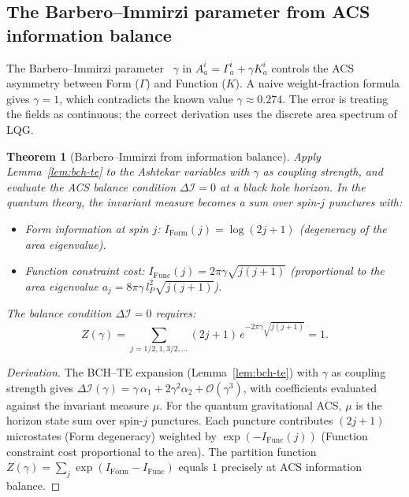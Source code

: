 \documentclass[11pt,a4paper]{article}
\theoremstyle{plain}
\newtheorem{theorem}{Theorem}[section]
\theoremstyle{definition}
\theoremstyle{remark}
\newcommand{\DI}{\Delta\mathcal{I}}
\newcommand{\Order}[1]{\mathcal{O}(#1)}
\begin{document}
\subsection{The Barbero--Immirzi parameter from ACS information balance}

The Barbero--Immirzi parameter~\cite{Barbero1995,Immirzi1997} $\gamma$ in $A^i_a = \Gamma^i_a + \gamma K^i_a$
controls the ACS asymmetry between Form ($\Gamma$) and Function ($K$).
A naive weight-fraction formula gives $\gamma = 1$, which contradicts the
known value $\gamma \approx 0.274$.  The error is treating the fields as
continuous; the correct derivation uses the discrete area spectrum of LQG.

\begin{theorem}[Barbero--Immirzi from information balance]\label{thm:BI}
Apply Lemma~\ref{lem:bch-te} to the Ashtekar variables with $\gamma$
as coupling strength, and evaluate the ACS balance condition $\DI = 0$
at a black hole horizon.  In the quantum theory, the invariant measure
becomes a sum over spin-$j$ punctures with:
\begin{itemize}[noitemsep]
  \item Form information at spin $j$: $I_{\mathrm{Form}}(j) = \log(2j+1)$
    (degeneracy of the area eigenvalue).
  \item Function constraint cost: $I_{\mathrm{Func}}(j) = 2\pi\gamma\sqrt{j(j+1)}$
    (proportional to the area eigenvalue $a_j = 8\pi\gamma\,l_P^2\sqrt{j(j+1)}$).
\end{itemize}
The balance condition $\DI = 0$ requires:
\begin{equation}\label{eq:BI-partition}
  Z(\gamma) = \sum_{j=1/2,1,3/2,\ldots} (2j+1)\,
  e^{-2\pi\gamma\sqrt{j(j+1)}} = 1.
\end{equation}
\end{theorem}

\begin{proof}[Derivation]
The BCH--TE expansion (Lemma~\ref{lem:bch-te}) with $\gamma$ as
coupling strength gives $\DI(\gamma) = \gamma\,\alpha_1 + 2\gamma^2\alpha_2 + \Order{\gamma^3}$,
with coefficients evaluated against the invariant measure $\mu$.
For the quantum gravitational ACS, $\mu$ is the horizon state sum
over spin-$j$ punctures.  Each puncture contributes $(2j+1)$ microstates
(Form degeneracy) weighted by $\exp(-I_{\mathrm{Func}}(j))$ (Function
constraint cost proportional to the area).  The partition function
$Z(\gamma) = \sum_j \exp(I_{\mathrm{Form}} - I_{\mathrm{Func}})$
equals $1$ precisely at ACS information balance.
\end{proof}
\end{document}
